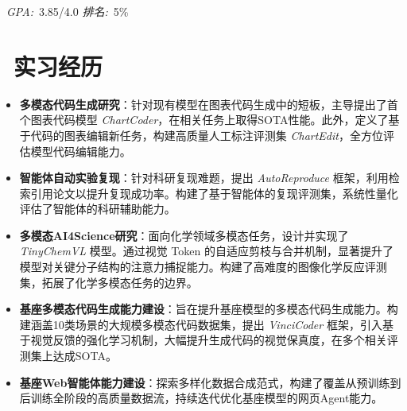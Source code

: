 \documentclass{resume}
\begin{document}




\
\textit{GPA:}\ 3.85/4.0 \textit{排名:}\ 5\%



\section{\faBriefcase\ 实习经历}
\begin{itemize}
    \item \textbf{多模态代码生成研究}：针对现有模型在图表代码生成中的短板，主导提出了首个图表代码模型 \textit{ChartCoder}，在相关任务上取得SOTA性能。此外，定义了基于代码的图表编辑新任务，构建高质量人工标注评测集 \textit{ChartEdit}，全方位评估模型代码编辑能力。
    \item \textbf{智能体自动实验复现}：针对科研复现难题，提出 \textit{AutoReproduce} 框架，利用检索引用论文以提升复现成功率。构建了基于智能体的复现评测集，系统性量化评估了智能体的科研辅助能力。
\end{itemize}

\begin{itemize}
    \item \textbf{多模态AI4Science研究}：面向化学领域多模态任务，设计并实现了 \textit{TinyChemVL} 模型。通过视觉 Token 的自适应剪枝与合并机制，显著提升了模型对关键分子结构的注意力捕捉能力。构建了高难度的图像化学反应评测集，拓展了化学多模态任务的边界。
\end{itemize}

\begin{itemize}
    \item \textbf{基座多模态代码生成能力建设}：旨在提升基座模型的多模态代码生成能力。构建涵盖10类场景的大规模多模态代码数据集，提出 \textit{VinciCoder} 框架，引入基于视觉反馈的强化学习机制，大幅提升生成代码的视觉保真度，在多个相关评测集上达成SOTA。
    \item \textbf{基座Web智能体能力建设}：探索多样化数据合成范式，构建了覆盖从预训练到后训练全阶段的高质量数据流，持续迭代优化基座模型的网页Agent能力。
\end{itemize}
\end{document}
